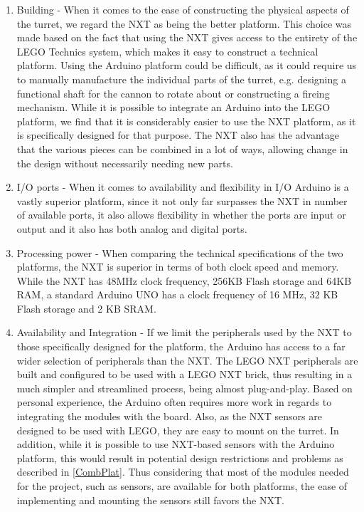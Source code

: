 
\begin{enumerate}
  \item Building - When it comes to the ease of constructing the physical
  aspects of the turret, we regard the NXT as being the better platform. This
  choice was made based on the fact that using the NXT gives access to the
  entirety of the LEGO Technics system, which makes it easy to construct a
  technical platform. Using the Arduino platform could be difficult, as it could
  require us to manually manufacture the individual parts of the turret, e.g.
  designing a functional shaft for the cannon to rotate about or constructing a
  fireing mechanism.
  While it is possible to integrate an Arduino into the LEGO platform, we find
  that it is considerably easier to use the NXT platform, as it is specifically
  designed for that purpose. The NXT also has the advantage that the various
  pieces can be combined in a lot of ways, allowing change in the design without
  necessarily needing new parts.

  \item I/O ports - When it comes to availability and flexibility in I/O
  Arduino is a vastly superior platform, since it not only far surpasses the NXT
  in number of available ports, it also allows flexibility in whether the ports
  are input or output and it also has both analog and digital ports.
  
  \item Processing power - When comparing the technical specifications of the
  two platforms, the NXT is superior in terms of both clock speed and memory.
  While the NXT has 48MHz clock frequency, 256KB Flash storage and 64KB RAM, a
  standard Arduino UNO has a clock frequency of 16 MHz, 32 KB Flash storage and
  2 KB SRAM.
  
  \item Availability and Integration - If we limit the peripherals used by the
  NXT to those specifically designed for the platform, the Arduino has access
  to a far wider selection of peripherals than the NXT. The LEGO NXT
  peripherals are built and configured to be used with a LEGO NXT brick, thus
  resulting in a much simpler and streamlined process, being almost
  plug-and-play. Based on personal experience, the Arduino often requires more
  work in regards to integrating the modules with the board. Also, as the NXT
  sensors are designed to be used with LEGO, they are easy to mount on the
  turret. In addition, while it is possible to use NXT-based sensors with the
  Arduino platform, this would result in potential design restrictions and
  problems as described in \autoref{CombPlat}. Thus considering that most of
  the modules needed for the project, such as sensors, are available for both
  platforms, the ease of implementing and mounting the sensors still favors the
  NXT.
\end{enumerate}

